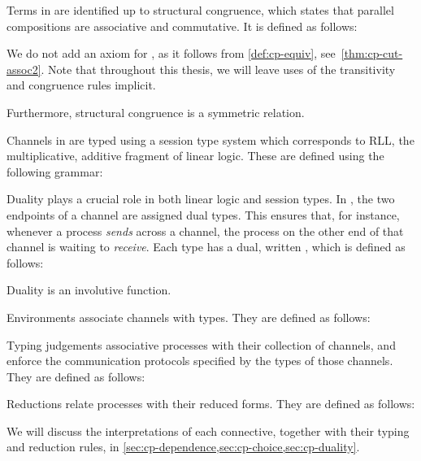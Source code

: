 Terms in \rcp are identified up to structural congruence, which states that
parallel compositions  are associative and commutative.
It is defined as follows:

We do not add an axiom for , as it follows from
\cref{def:cp-equiv}, see~\cref{thm:cp-cut-assoc2}.
Note that throughout this thesis, we will leave uses of the transitivity and
congruence rules implicit.

Furthermore, structural congruence is a symmetric relation.

%
Channels in \rcp are typed using a session type system which corresponds to RLL,
the multiplicative, additive fragment of linear logic.
These are defined using the following grammar:

Duality plays a crucial role in both linear logic and session types.
In \cp, the two endpoints of a channel are assigned dual types.
This ensures that, for instance, whenever a process \emph{sends} across a
channel, the process on the other end of that channel is waiting to
\emph{receive}.
Each type  has a dual, written , which is defined as follows:

Duality is an involutive function.

%
Environments associate channels with types. They are defined as follows:

Typing judgements associative processes with their collection of channels, and
enforce the communication protocols specified by the types of those channels.
They are defined as follows:


Reductions relate processes with their reduced forms.
They are defined as follows:


We will discuss the interpretations of each connective, together with their
typing and reduction rules, in
\cref{sec:cp-dependence,sec:cp-choice,sec:cp-duality}.

